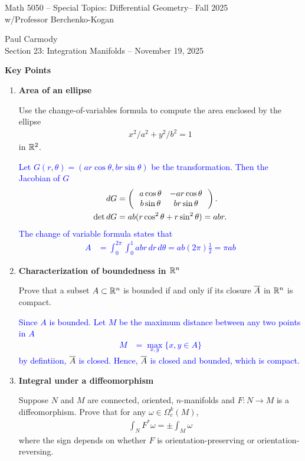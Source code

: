 \documentclass[12pt,a4paper]{report}
\newcommand{\CLASSNAME}{Math 5050 -- Special Topics: Differential Geometry}
\newcommand{\STUDENTNAME}{Paul Carmody}
\newcommand{\ASSIGNMENT}{Section 23: Integration Manifolds }
\newcommand{\DUEDATE}{November 19, 2025}
\newcommand{\PROFESSOR}{Professor Berchenko-Kogan}
\newcommand{\SEMESTER}{Fall 2025}
\newcommand{\BLUE}[1]{\textcolor{blue}{#1}}
\begin{document}
\begin{center}
	\Large{\CLASSNAME -- \SEMESTER} \\
	\large{ w/\PROFESSOR}
\end{center}
\begin{center}
	\STUDENTNAME \\
	\ASSIGNMENT -- \DUEDATE\\
\end{center} 

\textbf{Key Points}

\HLINE
\begin{enumerate}[label=23.\arabic*]

\item \textbf{Area of an ellipse}

Use the change-of-variables formula to compute the area enclosed by the ellipse
\begin{align*}
	x^2/a^2+y^2/b^2=1
\end{align*}in $\mathbb{R}^2$.

\BLUE{Let $G(r,\theta) = (ar\cos\theta, br\sin\theta)$ be the transformation.  Then  the Jacobian of $G$
\begin{align*}
	dG &= \left (\,  \begin{array}{c c} a\cos\theta&-ar\cos\theta \\ b\sin\theta & br\sin\theta \end{array}  \,\right ).\\
	\det dG &= ab(r\cos^2\theta+r\sin^2\theta) = abr.
\end{align*}The change of variable formula states that
\begin{align*}
	A &= \int_0^{2\pi}\int_0^1 abr\,dr\, d\theta = ab(2\pi)\frac{1}{2} = \pi ab
\end{align*}
}

\item \textbf{Characterization of boundedness in $\mathbb{R}^n$}

Prove that a subset $A \subset \mathbb{R}^n$ is bounded if and only if its closure $\overline{A}$ in $\mathbb{R}^n$ is compact.

\BLUE{Since $A$ is bounded. Let $M$ be the maximum distance between any two points in $A$
\begin{align*}
	M &= \max_{x,y} \{x,y \in A\}
\end{align*}by defintiion, $\overline{A}$ is closed.  Hence, $\overline{A}$ is closed and bounded, which is compact.
}

\item \textbf{Integral under a diffeomorphism}

Suppose $N$ and $M$ are connected, oriented, $n$-manifolds and $F: N \to M$ is a diffeomorphism.  Prove that for any $\omega \in \Omega_c^k(M)$,
\begin{align*}
	\int_NF^*\omega = \pm \int_M \omega
\end{align*} where the sign depends on whether $F$ is orientation-preserving or orientation-reversing.


\end{enumerate}
\end{document}
